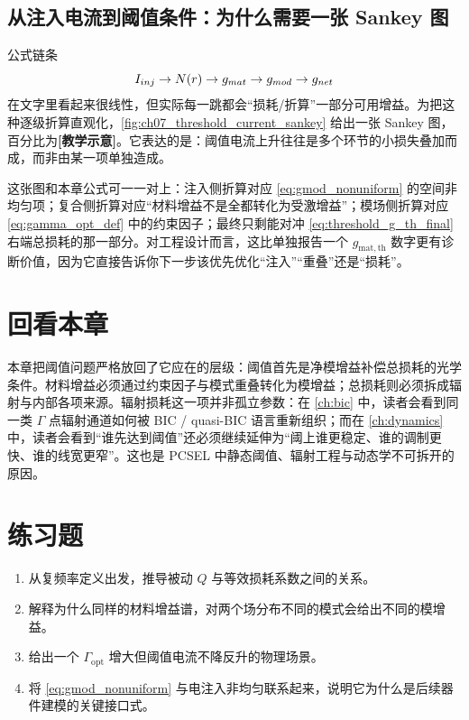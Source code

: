 

\subsection{从注入电流到阈值条件：为什么需要一张 Sankey 图}
公式链条
\[
I_{inj}\rightarrow N(r)\rightarrow g_{mat}\rightarrow g_{mod}\rightarrow g_{net}
\]
在文字里看起来很线性，但实际每一跳都会“损耗/折算”一部分可用增益。为把这种逐级折算直观化，\cref{fig:ch07_threshold_current_sankey} 给出一张 Sankey 图，百分比为\textbf{[教学示意]}。它表达的是：阈值电流上升往往是多个环节的小损失叠加而成，而非由某一项单独造成。



这张图和本章公式可一一对上：注入侧折算对应 \cref{eq:gmod_nonuniform} 的空间非均匀项；复合侧折算对应“材料增益不是全都转化为受激增益”；模场侧折算对应 \cref{eq:gamma_opt_def} 中的约束因子；最终只剩能对冲 \cref{eq:threshold_g_th_final} 右端总损耗的那一部分。对工程设计而言，这比单独报告一个 $g_{\mathrm{mat,th}}$ 数字更有诊断价值，因为它直接告诉你下一步该优先优化“注入”“重叠”还是“损耗”。

\section*{回看本章}
本章把阈值问题严格放回了它应在的层级：阈值首先是净模增益补偿总损耗的光学条件。材料增益必须通过约束因子与模式重叠转化为模增益；总损耗则必须拆成辐射与内部各项来源。辐射损耗这一项并非孤立参数：在 \cref{ch:bic} 中，读者会看到同一类 $\Gamma$ 点辐射通道如何被 BIC / quasi-BIC 语言重新组织；而在 \cref{ch:dynamics} 中，读者会看到“谁先达到阈值”还必须继续延伸为“阈上谁更稳定、谁的调制更快、谁的线宽更窄”。这也是 PCSEL 中静态阈值、辐射工程与动态学不可拆开的原因。

\section*{练习题}
\begin{enumerate}
  \item \basicq 从复频率定义出发，推导被动 $Q$ 与等效损耗系数之间的关系。

  \item \basicq 解释为什么同样的材料增益谱，对两个场分布不同的模式会给出不同的模增益。

  \item \midq 给出一个 $\Gamma_{\mathrm{opt}}$ 增大但阈值电流不降反升的物理场景。

  \item \hardq 将 \cref{eq:gmod_nonuniform} 与电注入非均匀联系起来，说明它为什么是后续器件建模的关键接口式。
\end{enumerate}

